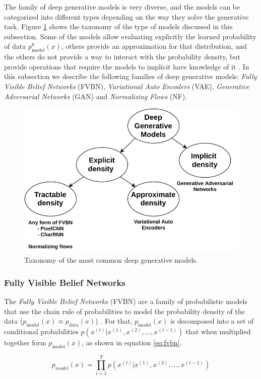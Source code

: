 The family of deep generative models is very diverse, and the models can be categorized into different types depending on the way they solve the generative task. Figure \ref{fig:generativetaxonomy} shows the taxonomy of the type of models discussed in this subsection. Some of the models allow evaluating explicitly the learned probability of data $p^\theta_\mathrm{model}(x)$, others provide an approximation for that distribution, and the others do not provide a way to interact with the probability density, but provide operations that require the models to implicit have knowledge of it \autocite{Goodfellow2016}. In this subsection we describe the following families of deep generative models: \textit{ Fully Visible Belief Networks} (FVBN), \textit{Variational Auto Encoders} (VAE), \textit{Generative Adversarial Networks} (GAN) and \textit{Normalizing Flows} (NF).

\begin{figure}
	\centering
	\includegraphics[width=0.7\linewidth]{chapter2/images/generativetaxonomy}
	\caption{Taxonomy of the most common deep generative models.}
	\label{fig:generativetaxonomy}
\end{figure}


\subsubsection{Fully Visible Belief Networks}
The \textit{Fully Visible Belief Networks} (FVBN) are a family of probabilistic models that use the chain rule of probabilities to model the probability density of the data ($p_\mathrm{model}(x) \approx p_\mathrm{data}(x)$) \autocite{smith2018}. For that, $p_\mathrm{model}(x)$ is decomposed into a set of conditional probabilities $p(x^{(t)}| x^{(1)}, x^{(2)}, \ldots, x^{(t-1)})$ that when multiplied together form  $p_\mathrm{model}(x)$, as shown in equation \ref{eq:fvbn}.

\begin{equation}
	\label{eq:fvbn}
	p_{model}(x) = \prod_{i=1}^{T} p(x^{(t)}| x^{(1)}, x^{(2)}, ..., x^{(t-1)})
\end{equation}

